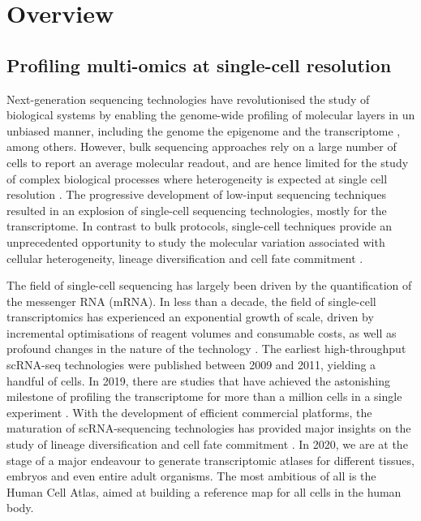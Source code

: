 \graphicspath{{Introduction/Figs/}}

\chapter{Overview}

\section{Profiling multi-omics at single-cell resolution}

Next-generation sequencing technologies have revolutionised the study of biological systems by enabling the genome-wide profiling of molecular layers in un unbiased manner, including the genome \cite{Fleischmann1995} the epigenome \cite{Frommer1992} and the transcriptome \cite{Lister2008,Bainbridge2006,Nagalakshmi2008,Mortazavi2008}, among others. However, bulk sequencing approaches rely on a large number of cells to report an average molecular readout, and are hence limited for the study of complex biological processes where heterogeneity is expected at single cell resolution \cite{Griffiths2018,Papalexi2017,Patel2014}. The progressive development of low-input sequencing techniques resulted in an explosion of single-cell sequencing technologies, mostly for the transcriptome. In contrast to bulk protocols, single-cell techniques provide an unprecedented opportunity to study the molecular variation associated with cellular heterogeneity, lineage diversification and cell fate commitment \cite{Kolodziejczyk2015}.

The field of single-cell sequencing has largely been driven by the quantification of the messenger RNA (mRNA). In less than a decade, the field of single-cell transcriptomics has experienced an exponential growth of scale, driven by incremental optimisations of reagent volumes and consumable costs, as well as profound changes in the nature of the technology \cite{Svensson2018}. The earliest high-throughput scRNA-seq technologies were published between 2009 and 2011, yielding a handful of cells. In 2019, there are studies that have achieved the astonishing milestone of profiling the transcriptome for more than a million cells in a single experiment \cite{Cao2019}. With the development of efficient commercial platforms, the maturation of scRNA-sequencing technologies has provided major insights on the study of lineage diversification and cell fate commitment \cite{Kolodziejczyk2015,Griffiths2018,Papalexi2017,Patel2014}. In 2020, we are at the stage of a major endeavour to generate transcriptomic atlases for different tissues, embryos and even entire adult organisms. The most ambitious of all is the Human Cell Atlas, aimed at building a reference map for all cells in the human body\cite{Aviv2017}.

